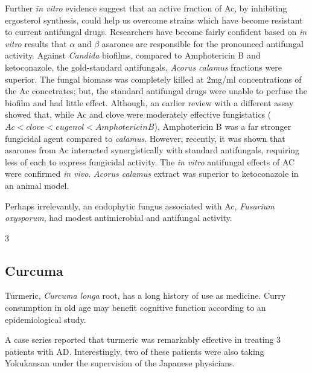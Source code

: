 \documentclass[twocolumn]{article}
\begin{document}
Further \textit{in vitro} evidence suggest that
an active fraction of Ac,
by inhibiting ergosterol synthesis,
could help us overcome strains which have become
resistant to current antifungal drugs.
\cite{
subha2008effect,
subha2009vitro
}
Researchers have become fairly confident based on \textit{in vitro}
results that $\alpha$ and $\beta$ asarones are responsible for
the pronounced antifungal activity.
\cite{devi2009antimicrobial}
Against \textit{Candida} biofilms,
compared to Amphotericin B and ketoconazole, the gold-standard antifungals,
\textit{Acorus calamus} fractions were superior.
The fungal biomass was completely killed at 2mg/ml concentrations
of the Ac concetrates; but, the standard antifungal drugs
were unable to perfuse the biofilm and had little effect.
\cite{subha2009candida}
Although, an earlier review with a different assay
showed that, while Ac and clove were moderately effective fungistatics
($Ac < clove < eugenol < Amphotericin B$),
Amphotericin B was a far stronger fungicidal agent
compared to \textit{calamus}.
\cite{thirach2003antifungal}
However, recently,
it was shown that asarones from Ac interacted
synergistically with standard antifungals,
requiring less of each to express fungicidal activity.
\cite{kumar2015asarones}
The \textit{in vitro} antifungal effects of AC
were confirmed \textit{in vivo}.
\textit{Acorus calamus} extract
was superior to ketoconazole in an animal model.
\cite{subha2009combating}


Perhaps irrelevantly, an endophytic fungus associated with Ac,
\textit{Fusarium oxysporum},
had modest antimicrobial and antifungal
activity.
\cite{barik2010phylogenetic}

3




\subsection{Curcuma}

Turmeric, \textit{Curcuma longa} root, has a long history of use as medicine.
\cite{?}
Curry consumption in old age may benefit cognitive function
according to an epidemiological study.
\cite{ng2006curry}

A case series reported that turmeric was remarkably effective
in treating 3 patients with AD.
Interestingly, two of these patients were also taking
Yokukansan under the supervision of the Japanese physicians.
\cite{hishikawa2012effects}




\end{document}
